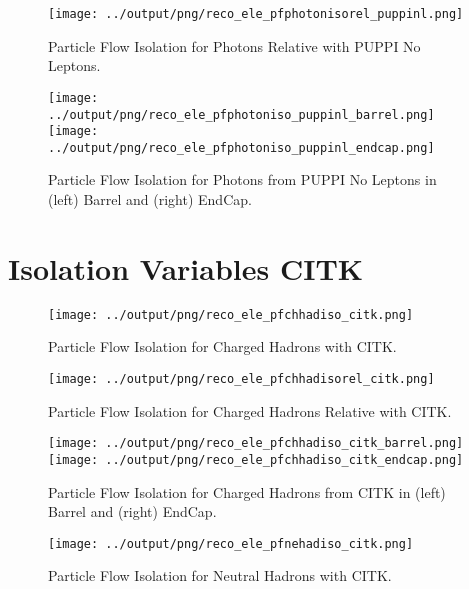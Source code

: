 \documentclass[11pt]{book}
\begin{document}
\begin{figure}[htb]
\centering
\texttt{[image: ../output/png/reco\_ele\_pfphotonisorel\_puppinl.png]}
\caption{Particle Flow Isolation for Photons Relative with PUPPI No Leptons.}
\label{fig:reco_ele_pfphotonisorel_puppinl}
\end{figure}

\begin{figure}[ht]
\centering
\texttt{[image: ../output/png/reco\_ele\_pfphotoniso\_puppinl\_barrel.png]}
\texttt{[image: ../output/png/reco\_ele\_pfphotoniso\_puppinl\_endcap.png]}
\caption{Particle Flow Isolation for Photons from PUPPI No Leptons in (left) Barrel and (right) EndCap.}
\label{fig:reco_ele_pfphotoniso_puppinl_regions}
\end{figure}

\clearpage


\clearpage
\section{Isolation Variables CITK}

\begin{figure}[htb]
\centering
\texttt{[image: ../output/png/reco\_ele\_pfchhadiso\_citk.png]}
\caption{Particle Flow Isolation for Charged Hadrons with CITK.}
\label{fig:reco_ele_pfchhadiso_citk}
\end{figure}

\begin{figure}[htb]
\centering
\texttt{[image: ../output/png/reco\_ele\_pfchhadisorel\_citk.png]}
\caption{Particle Flow Isolation for Charged Hadrons Relative with CITK.}
\label{fig:reco_ele_pfchhadisorel_citk}
\end{figure}

\begin{figure}[ht]
\centering
\texttt{[image: ../output/png/reco\_ele\_pfchhadiso\_citk\_barrel.png]}
\texttt{[image: ../output/png/reco\_ele\_pfchhadiso\_citk\_endcap.png]}
\caption{Particle Flow Isolation for Charged Hadrons from CITK in (left) Barrel and (right) EndCap.}
\label{fig:reco_ele_pfchhadiso_citk_regions}
\end{figure}

\begin{figure}[htb]
\centering
\texttt{[image: ../output/png/reco\_ele\_pfnehadiso\_citk.png]}
\caption{Particle Flow Isolation for Neutral Hadrons with CITK.}
\label{fig:reco_ele_pfnehadiso_citk}
\end{figure}
\end{document}
